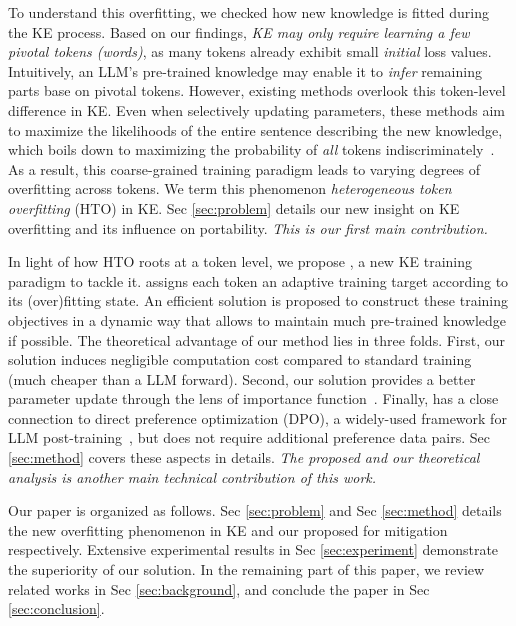 
To understand this overfitting, 
we checked how new knowledge is fitted during the KE process. 
Based on our findings,
\textit{KE may only require learning a few pivotal tokens (words)},
as many tokens already exhibit small \textit{initial} loss values. 
Intuitively, an LLM's pre-trained knowledge may enable it to \textit{infer} remaining parts base on pivotal tokens. 
However, existing methods overlook this token-level difference in KE.
Even when selectively updating parameters, 
these methods aim to maximize the likelihoods of the {entire} sentence describing the new knowledge, 
which boils down to maximizing the probability of \textit{all} tokens indiscriminately~\citep{bengio2000neural,radford2019language,brown2020language}. 
As a result, this coarse-grained training paradigm leads to varying degrees of overfitting across tokens. 
We term this phenomenon \textit{heterogeneous token overfitting} (HTO) in KE.
Sec \ref{sec:problem} details our new insight on KE overfitting and its influence on portability. \textit{This is our first main contribution.}


In light of how HTO roots at a token level,
we propose {\NAME}, a new KE training paradigm to tackle it.
{\NAME} assigns each token an adaptive training target according to its (over)fitting state.
An efficient solution is proposed to construct these training objectives in a dynamic way that allows to maintain much pre-trained knowledge if possible. 
The theoretical advantage of our method lies in three folds. 
First, our solution induces negligible computation cost compared to standard training (much cheaper than a LLM forward).
{Second, our solution provides a better parameter update through the lens of importance function~\citep{koh2017understanding}.} 
Finally, {\NAME} has a close connection to direct preference optimization (DPO), a widely-used framework for LLM post-training~\citep{rafailov2024direct,zhang2024negative}, but does not require additional preference data pairs. 
Sec \ref{sec:method} covers these aspects in details.
\textit{The proposed {\NAME} and our theoretical analysis is another main technical contribution of this work.}





Our paper is organized as follows. 
Sec \ref{sec:problem} and Sec \ref{sec:method} details the new overfitting phenomenon in KE 
and our proposed {\NAME} for mitigation respectively. 
Extensive experimental results in Sec \ref{sec:experiment} demonstrate the superiority of our solution. 
In the remaining part of this paper, we review related works in Sec \ref{sec:background}, and conclude the paper in Sec \ref{sec:conclusion}. 
